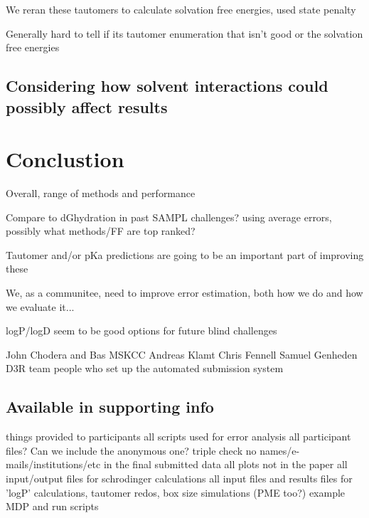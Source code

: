 We reran these tautomers to calculate solvation free energies, used state penalty %

Generally hard to tell if its tautomer enumeration that isn't good or the solvation free energies

\subsection{Considering how solvent interactions could possibly affect results} %
\label{results:7}

\section{Conclustion}
\label{conclusions}

Overall, range of methods and performance

Compare to dGhydration in past SAMPL challenges? using average errors, possibly what methods/FF are top ranked?

Tautomer and/or pKa predictions are going to be an important part of improving these

We, as a communitee, need to improve error estimation, both how we do and how we evaluate it...

logP/logD seem to be good options for future blind challenges

\begin{acknowledgements} %
John Chodera and Bas MSKCC
Andreas Klamt
Chris Fennell
Samuel Genheden
D3R team
people who set up the automated submission system %


\end{acknowledgements}

\subsection{Available in supporting info} %
things provided to participants
all scripts used for error analysis
all participant files? Can we include the anonymous one? 
triple check no names/e-mails/institutions/etc in the final submitted data
all plots not in the paper
all input/output files for schrodinger calculations
all input files and results files for 'logP' calculations, tautomer redos, box size simulations (PME too?) 
example MDP and run scripts
 


